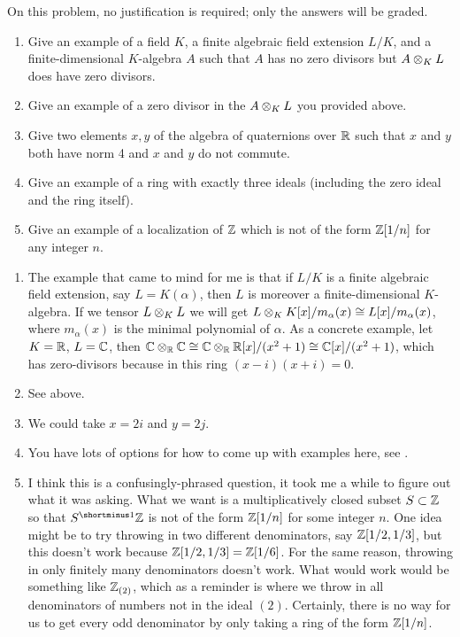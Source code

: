 \begin{question}[subtitle=August 2023 Problem 1,ID=Aug23_1]
On this problem, no justification is required; only the answers will be graded.
\begin{enumerate}
    \item Give an example of a field $K$, a finite algebraic field extension $L/K$, and a finite-dimensional $K$-algebra $A$ such that $A$ has no zero divisors but $A \otimes_K L$ does have zero divisors.
    \item Give an example of a zero divisor in the $A \otimes_K L$ you provided above.
    \item Give two elements $x,y$ of the algebra of quaternions over $\mathbb{R}$ such that $x$ and $y$ both have norm 4 and $x$ and $y$ do not commute.
    \item Give an example of a ring with exactly three ideals (including the zero ideal and the ring itself). %
    \item Give an example of a localization of $\mathbb{Z}$ which is not of the form $\mathbb{Z}[1/n]$ for any integer $n$.
\end{enumerate}
\end{question}
\begin{solution}
\begin{enumerate}
    \item The example that came to mind for me is that if $L/K$ is a finite algebraic field extension, say $L = K(\alpha)$, then $L$ is moreover a finite-dimensional $K$-algebra. If we tensor $L \otimes_K L$ we will get $L \otimes_K K[x]/m_{\alpha}(x) \cong L[x]/m_{\alpha}(x)$, where $m_{\alpha}(x)$ is the minimal polynomial of $\alpha$. As a concrete example, let $K = \mathbb{R}$, $L = \mathbb{C}$, then $\mathbb{C} \otimes_{\mathbb{R}} \mathbb{C} \cong \mathbb{C} \otimes_{\mathbb{R}} \mathbb{R}[x]/(x^2+1) \cong \mathbb{C}[x]/(x^2+1)$, which has zero-divisors because in this ring $(x-i)(x+i) = 0$.
    \item See above.
    \item We could take $x = 2i$ and $y = 2j$.
    \item You have lots of options for how to come up with examples here, see .
    \item I think this is a confusingly-phrased question, it took me a while to figure out what it was asking. What we want is a multiplicatively closed subset $S \subset \mathbb{Z}$ so that $S\inv \Z$ is not of the form $\mathbb{Z}[1/n]$ for some integer $n$. One idea might be to try throwing in two different denominators, say $\mathbb{Z}[1/2,1/3]$, but this doesn't work because $\mathbb{Z}[1/2,1/3] = \mathbb{Z}[1/6]$. For the same reason, throwing in only finitely many denominators doesn't work. What would work would be something like $\mathbb{Z}_{(2)}$, which as a reminder is where we throw in all denominators of numbers not in the ideal $(2)$. Certainly, there is no way for us to get every odd denominator by only taking a ring of the form $\mathbb{Z}[1/n]$.
\end{enumerate}
\end{solution}

